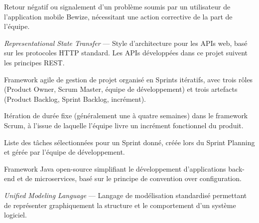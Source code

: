 \begin{description}[leftmargin=4cm, labelwidth=3.5cm]
    \vspace{0.3cm}

    \item[\textbf{Réclamation}] Retour négatif ou signalement d'un 
    problème soumis par un utilisateur de l'application mobile 
    Bewize, nécessitant une action corrective de la part de l'équipe.

    \vspace{0.3cm}

    \item[\textbf{REST}] \textit{Representational State Transfer} — 
    Style d'architecture pour les APIs web, basé sur les protocoles 
    HTTP standard. Les APIs développées dans ce projet suivent 
    les principes REST.

    \vspace{0.3cm}

    \item[\textbf{Scrum}] Framework agile de gestion de projet 
    organisé en Sprints itératifs, avec trois rôles (Product Owner, 
    Scrum Master, équipe de développement) et trois artefacts 
    (Product Backlog, Sprint Backlog, incrément).

    \vspace{0.3cm}

    \item[\textbf{Sprint}] Itération de durée fixe (généralement 
    une à quatre semaines) dans le framework Scrum, à l'issue 
    de laquelle l'équipe livre un incrément fonctionnel du produit.

    \vspace{0.3cm}

    \item[\textbf{Sprint Backlog}] Liste des tâches sélectionnées 
    pour un Sprint donné, créée lors du Sprint Planning et gérée 
    par l'équipe de développement.

    \vspace{0.3cm}

    \item[\textbf{Spring Boot}] Framework Java open-source simplifiant 
    le développement d'applications back-end et de microservices, 
    basé sur le principe de convention over configuration.

    \vspace{0.3cm}

    \item[\textbf{UML}] \textit{Unified Modeling Language} — Langage 
    de modélisation standardisé permettant de représenter graphiquement 
    la structure et le comportement d'un système logiciel.


\end{description}
